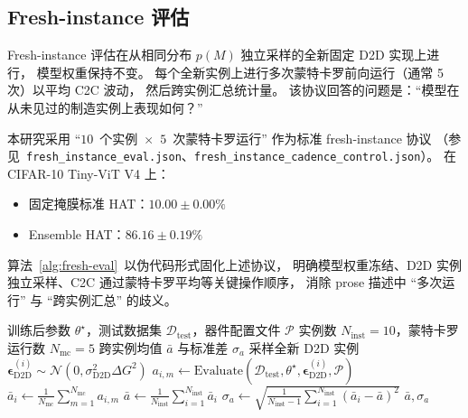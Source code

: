 \subsection{Fresh-instance 评估}

Fresh-instance 评估在从相同分布 $p(M)$ 独立采样的全新固定 D2D 实现上进行，
模型权重保持不变。
每个全新实例上进行多次蒙特卡罗前向运行（通常 5 次）以平均 C2C 波动，
然后跨实例汇总统计量。
该协议回答的问题是：``模型在从未见过的制造实例上表现如何？''

本研究采用 ``$10$~个实例~$\times$~$5$~次蒙特卡罗运行'' 作为标准 fresh-instance 协议
（参见~\texttt{fresh\_instance\_eval.json}、\texttt{fresh\_instance\_cadence\_control.json}）。
在 CIFAR-10 Tiny-ViT V4 上：
\begin{itemize}
    \item 固定掩膜标准 HAT：$10.00\pm0.00\%$
    \item Ensemble HAT：$86.16\pm0.19\%$
\end{itemize}

算法~\ref{alg:fresh-eval}~以伪代码形式固化上述协议，
明确模型权重冻结、D2D 实例独立采样、C2C 通过蒙特卡罗平均等关键操作顺序，
消除 prose 描述中 ``多次运行'' 与 ``跨实例汇总'' 的歧义。

\begin{algorithm}[t]
\caption{Fresh-instance 评估协议}
\label{alg:fresh-eval}
\begin{algorithmic}[1]
\Require 训练后参数 $\theta^{\star}$，测试数据集 $\mathcal{D}_{\text{test}}$，器件配置文件 $\mathcal{P}$
\Require 实例数 $N_{\text{inst}} = 10$，蒙特卡罗运行数 $N_{\text{mc}} = 5$
\Ensure 跨实例均值 $\bar{a}$ 与标准差 $\sigma_{a}$
    \State 采样全新 D2D 实例 $\boldsymbol{\epsilon}_{\text{D2D}}^{(i)} \sim \mathcal{N}(0, \sigma_{\text{D2D}}^{2} \Delta G^{2})$
        \State $a_{i,m} \gets \text{Evaluate}(\mathcal{D}_{\text{test}}, \theta^{\star}, \boldsymbol{\epsilon}_{\text{D2D}}^{(i)}, \mathcal{P})$
    \EndFor
    \State $\bar{a}_i \gets \frac{1}{N_{\text{mc}}} \sum_{m=1}^{N_{\text{mc}}} a_{i,m}$ 
\EndFor
\State $\bar{a} \gets \frac{1}{N_{\text{inst}}} \sum_{i=1}^{N_{\text{inst}}} \bar{a}_i$ 
\State $\sigma_{a} \gets \sqrt{\frac{1}{N_{\text{inst}}-1} \sum_{i=1}^{N_{\text{inst}}} (\bar{a}_i - \bar{a})^2}$ 
\State \Return $\bar{a}, \sigma_{a}$
\end{algorithmic}
\end{algorithm}

